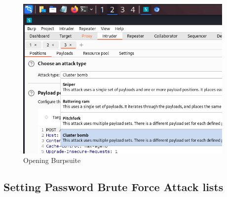 \documentclass[11pt]{article}
\begin{document}


\begin{figure}[H]
    \centering
    \includegraphics[width=0.95\textwidth]{burpsuite (5).png}
    \caption{Opening Burpsuite}
    \label{fig:1}
\end{figure}
\subsection{Setting Password Brute Force Attack lists}


\end{document}
